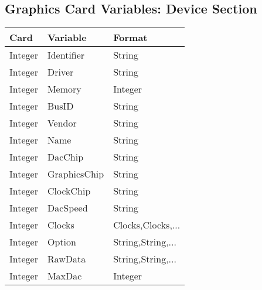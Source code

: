 \subsection{Graphics Card Variables: Device Section}
\begin{tabular}[h]{|p{2cm}|p{4cm}|p{7cm}|}
 \hline
 \textbf{Card} & \textbf{Variable}     & \textbf{Format}        \\
 \hline
 Integer & Identifier      & String                             \\
 Integer & Driver          & String                             \\
 Integer & Memory          & Integer                            \\
 Integer & BusID           & String                             \\
 Integer & Vendor          & String                             \\
 Integer & Name            & String                             \\
 Integer & DacChip         & String                             \\
 Integer & GraphicsChip    & String                             \\
 Integer & ClockChip       & String                             \\
 Integer & DacSpeed        & String                             \\
 Integer & Clocks          & Clocks,Clocks,...                  \\
 Integer & Option          & String,String,...                  \\
 Integer & RawData         & String,String,...                  \\
 Integer & MaxDac          & Integer                            \\
 \hline
\end{tabular}


